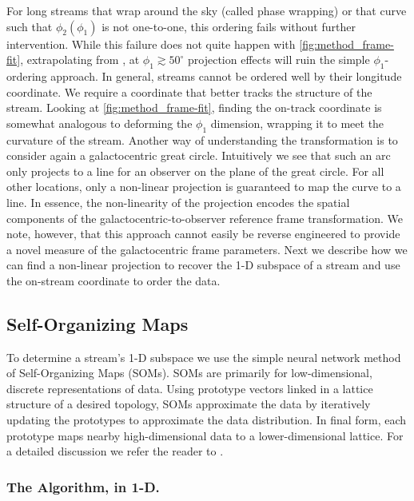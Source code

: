 \documentclass[fleqn,usenatbib]{mnras}
\begin{document}
    For long streams that wrap around the sky (called phase wrapping) or that
    curve such that $\phi_2(\phi_1)$ is not one-to-one, this ordering fails
    without further intervention. While this failure does not quite happen with
    \autoref{fig:method_frame-fit}, extrapolating from , at
    $\phi_1 \gtrsim 50^\circ$ projection effects will ruin the simple
    $\phi_1$-ordering approach. In general, streams cannot be ordered well by
    their longitude coordinate. We require a coordinate that better tracks the
    structure of the stream. Looking at \autoref{fig:method_frame-fit}, finding
    the on-track coordinate is somewhat analogous to deforming the $\phi_1$
    dimension, wrapping it to meet the curvature of the stream. Another way of
    understanding the transformation is to consider again a galactocentric great
    circle. Intuitively we see that such an arc only projects to a line for an
    observer on the plane of the great circle. For all other locations, only a
    non-linear projection is guaranteed to map the curve to a line. In essence,
    the non-linearity of the projection encodes the spatial components of the
    galactocentric-to-observer reference frame transformation. We note, however,
    that this approach cannot easily be reverse engineered to provide a novel
    measure of the galactocentric frame parameters. Next we describe how we can
    find a non-linear projection to recover the 1-D subspace of a stream and use
    the on-stream coordinate to order the data.


  \subsection{Self-Organizing Maps} \label{sub:self_organizing_maps}

    To determine a stream's 1-D subspace we use the simple neural network method
    of Self-Organizing Maps (SOMs). SOMs are primarily for low-dimensional,
    discrete representations of data. Using prototype vectors linked in a
    lattice structure of a desired topology, SOMs approximate the data by
    iteratively updating the prototypes to approximate the data distribution. In
    final form, each prototype maps nearby high-dimensional data to a
    lower-dimensional lattice. For a detailed discussion we refer the reader to
    \cite{DataScience}.


    \subsubsection{The Algorithm, in 1-D.} \label{ssub:som_math_overview}
\end{document}
